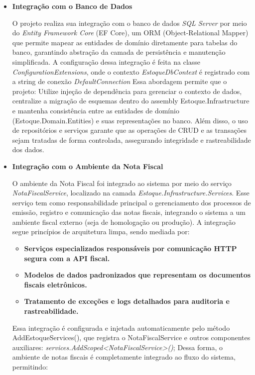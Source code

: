\documentclass[
	12pt,				%
	openany,			%
	twoside,			%
	a4paper,			%
	english,			%
	brazil				%
	]{abntex2}
\begin{document}
\begin{itemize}

 \item \textbf{Integração com o Banco de Dados}

O projeto realiza sua integração com o banco de dados \textit{SQL Server} por meio do \textit{Entity Framework Core} (EF Core), um ORM (Object-Relational Mapper) que permite mapear as entidades de domínio diretamente para tabelas do banco, garantindo abstração da camada de persistência e manutenção simplificada. A configuração dessa integração é feita na classe \textit{ConfigurationExtensions}, onde o contexto \textit{EstoqueDbContext} é registrado com a string de conexão \textit{DefaultConnection}
Essa abordagem permite que o projeto: Utilize injeção de dependência para gerenciar o contexto de dados, centralize a migração de esquemas dentro do assembly Estoque.Infrastructure e mantenha consistência entre as entidades de domínio (Estoque.Domain.Entities) e suas representações no banco. Além disso, o uso de repositórios e serviços garante que as operações de CRUD e as transações sejam tratadas de forma controlada, assegurando integridade e rastreabilidade dos dados.


 \item \textbf{Integração com o Ambiente da Nota Fiscal}

O ambiente da Nota Fiscal foi integrado ao sistema por meio do serviço  \textit{NotaFiscalService}, localizado na camada  \textit{Estoque.Infrastructure.Services}.
Esse serviço tem como responsabilidade principal o gerenciamento dos processos de emissão, registro e comunicação das notas fiscais, integrando o sistema a um ambiente fiscal externo (seja de homologação ou produção).
A integração segue princípios de arquitetura limpa, sendo mediada por:

\begin{itemize}
 \item \textbf{Serviços especializados responsáveis por comunicação HTTP segura com a API fiscal.}
 \item \textbf{Modelos de dados padronizados que representam os documentos fiscais eletrônicos.}
 \item \textbf{Tratamento de exceções e logs detalhados para auditoria e rastreabilidade.}
\end{itemize}

Essa integração é configurada e injetada automaticamente pelo método AddEstoqueServices(), que registra o NotaFiscalService e outros componentes auxiliares:
 \textit{services.AddScoped<NotaFiscalService>()};
Dessa forma, o ambiente de notas fiscais é completamente integrado ao fluxo do sistema, permitindo:


\end{itemize}
\end{document}
